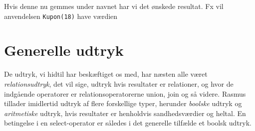 \documentclass{article}
\newcounter{eks}
\begin{document}

Hvis denne nu gemmes under navnet  har vi det
\o{}nskede resultat. Fx vil anvendelsen \verb"Kupon(18)" have
v\ae{}rdien
\begin{center}
\end{center}

\newpage
\section{Generelle udtryk}
De udtryk, vi hidtil har besk\ae{}ftiget os med, har n\ae{}sten alle
v\ae{}ret {\em relationsudtryk}, det vil sige, udtryk hvis resultater er
relationer, og hvor de indg\aa{}ende operatorer er relationsoperatorerne
union, join og s\aa{} videre. {\sc Rasmus} tillader imidlertid udtryk af
flere forskellige typer, herunder {\em boolske\/} udtryk og
{\em aritmetiske\/} udtryk, hvis resultater er henholdvis
sandhedsv\ae{}rdier og heltal. En betingelse i en select-operator er
s\aa{}ledes i det generelle tilf\ae{}lde et boolsk udtryk. 
\end{document}
